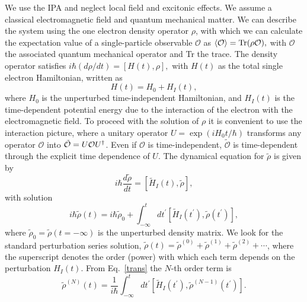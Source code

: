 \documentclass[floatfix,prb,aps,superscriptaddress,11pt,preprint,letterpaper]{revtex4}
\def\chon{black}
\begin{document}
We use the IPA and neglect local field  
and excitonic effects{\color{\chon}.  
We assume a classical} electromagnetic field
{\color{\chon} and quantum mechanical matter.}
We can describe the system using 
the one electron density
operator ${\rho}$, with which we can calculate the expectation value of a
single-particle observable $\mathcal{O}$ as 
$\langle{\cal O}\rangle=\mbox{Tr}({\rho} {\cal O}),  
\label{calo}$
with $\mathcal{O}$ the associated quantum mechanical operator and Tr
the trace. 
The density operator satisfies
$
i\hbar (d{\rho}/dt)=[H(t),{\rho}],  
\label{rho}
$
with $H(t)$ as the total single electron Hamiltonian, written as 
\begin{equation*}
H(t)=H_{0}+H_{I}(t),  
\label{ache}
\end{equation*}
where $H_{0}$ is the unperturbed time-independent Hamiltonian, and $H_{I}(t)$
is the time-dependent potential energy due to the interaction of the
electron with the electromagnetic field.
To proceed with the solution of $\rho$  it is convenient to use the
interaction picture, where a unitary operator $U=\exp ({iH_{0}t/\hbar })$
transforms any operator $\mathcal{O}$ into 
$\tilde{\mathcal{O}}=U{\cal O}U^{\dagger }$. Even if $\mathcal{O}$ 
{\color{\chon} is time-independent}, 
$\tilde{\mathcal{O}}$ {\color{\chon} is time-dependent} through the explicit
time dependence of $U$. 
The dynamical 
equation for $\tilde{\rho}$ is 
given by
\begin{equation*}
i\hbar \frac{d\tilde{{\rho}}}{dt}=[\tilde{H}_{I}(t),\tilde{{\rho}}],  
\label{rho1}
\end{equation*}
with solution 
\begin{equation}
i\hbar \tilde{{\rho}}(t)=i\hbar \tilde{{\rho}}_{0}+\int_{-\infty }^{t}dt^{\prime }[
\tilde{H}_{I}(t^{\prime }),\tilde{\rho}(t^{\prime })],  
\label{trans}
\end{equation}
where $\tilde{\rho}_{0}=\tilde{\rho}(t=-\infty )$ is the unperturbed density matrix. We look
for the standard perturbation series solution, 
$\tilde{\rho}(t)=\tilde{\rho}^{(0)}+\tilde{\rho}^{(1)}+\tilde{\rho}^{(2)}+\cdots$,  
where the superscript denotes the order (power) with which each term depends
on the perturbation $H_{I}(t)$. From Eq.~\eqref{trans} the $N$-th order
term is 
\begin{equation}
\tilde{{\rho}}^{(N)}(t)=\frac{1}{i\hbar }\int_{-\infty }^{t}dt^{\prime }[\tilde{
H}_{I}(t^{\prime }),\tilde{\rho}^{(N-1)}(t^{\prime })].  
\label{rhop}
\end{equation}
\end{document}
